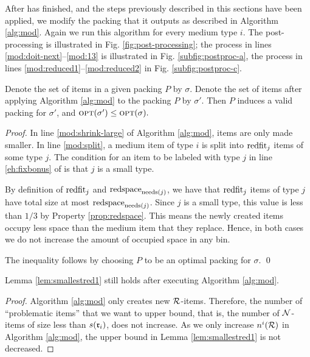 After {\EHarm} has finished, and the steps previously described in this sections have been applied,
we modify the packing that it outputs as described in Algorithm \ref{alg:mod}. 
Again we run this algorithm for every medium type $i$.
The post-processing is illustrated in Fig. \ref{fig:post-processing}; the process in lines \ref{mod:doit-next}--\ref{mod:13} is illustrated in Fig. \ref{subfig:postproc-a}, the process in lines \ref{mod:reduced1}--\ref{mod:reduced2} in Fig. \ref{subfig:postproc-c}.
\begin{lemma}
\label{lem:noincrease}
Denote the set of items in a given packing $P$ by $\sigma$.
Denote the set of items after applying Algorithm \ref{alg:mod} to the packing $P$ by $\sigma'$. Then $P$ induces a valid packing for $\sigma'$, and
$
\mbox{\textsc{opt}}(\sigma')\le \mbox{\textsc{opt}}(\sigma).
$
\end{lemma}
\begin{proof}
In line \ref{mod:shrink-large} of Algorithm \ref{alg:mod}, items are only made smaller. In line \ref{mod:split}, a medium item of type $i$ is split into $\mathrm{redfit}_j$ items of some type $j$. 
The condition for an item to be labeled with type $j$ in line \ref{eh:fixbonus} of 
{\EHarm} is that $j$ is a small type.

By definition of $\mathrm{redfit}_j$ and $\mathrm{redspace}_{\mathrm{needs}(j)}$, 
we have that $\mathrm{redfit}_j$ items of type $j$ have
total size at most $\mathrm{redspace}_{\mathrm{needs}(j)}$. Since $j$ is a small type, this value is less than $1/3$ by Property \ref{prop:redspace}.
This means the newly created items occupy less space than the medium item that they replace. Hence, in both cases we do not increase the amount of occupied space in any bin.

The inequality follows by choosing $P$ to be an optimal packing for $\sigma$.
\qed\end{proof}

\begin{lemma}
Lemma \ref{lem:smallestred1} still holds after executing Algorithm \ref{alg:mod}.
\end{lemma}
\begin{proof}
Algorithm \ref{alg:mod} only creates new $\mathcal{R}$-items. Therefore, the number of ``problematic items'' that we want to upper bound, that is, the number of $\mathcal{N}$-items of size less than $s(\mathfrak{r}_i)$, does not increase. As we only increase $n^i(\mathcal{R})$ in Algorithm \ref{alg:mod}, the upper bound in Lemma \ref{lem:smallestred1} is not decreased.
\end{proof}


